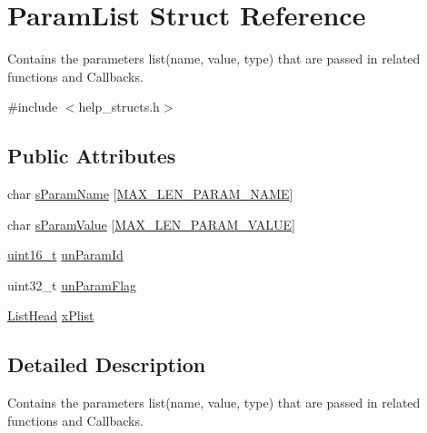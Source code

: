\hypertarget{structParamList}{\section{Param\-List Struct Reference}
\label{structParamList}
}


Contains the parameters list(name, value, type) that are passed in related functions and Callbacks.  




{\ttfamily \#include $<$help\-\_\-structs.\-h$>$}

\subsection*{Public Attributes}
\begin{DoxyCompactItemize}
\item 
char \hyperlink{structParamList_a2705606e7fccfd011246eda4370cb8f0}{s\-Param\-Name} \mbox{[}\hyperlink{group__LIBHELP_gaac5d922b6e3eb48b7ba829979fd73ae2}{M\-A\-X\-\_\-\-L\-E\-N\-\_\-\-P\-A\-R\-A\-M\-\_\-\-N\-A\-M\-E}\mbox{]}
\item 
char \hyperlink{structParamList_a0de8a21274ebfa45ff846cd53e5079fd}{s\-Param\-Value} \mbox{[}\hyperlink{group__LIBHELP_ga1b79b737d896845c1c07d942ffbfe3fa}{M\-A\-X\-\_\-\-L\-E\-N\-\_\-\-P\-A\-R\-A\-M\-\_\-\-V\-A\-L\-U\-E}\mbox{]}
\item 
\hyperlink{commondefs_8h_adf4d876453337156dde61095e1f20223}{uint16\-\_\-t} \hyperlink{structParamList_a84f52fb3f1b8ea341ccf0ebbb7e562f6}{un\-Param\-Id}
\item 
uint32\-\_\-t \hyperlink{structParamList_a36893c4507f528c478b7f22e0b1277a4}{un\-Param\-Flag}
\item 
\hyperlink{group__LIBHELP_ga73f73d414f252ff46652f16495641187}{List\-Head} \hyperlink{structParamList_ab46066381446f338d777c744f01d0955}{x\-Plist}
\end{DoxyCompactItemize}


\subsection{Detailed Description}
Contains the parameters list(name, value, type) that are passed in related functions and Callbacks. 

